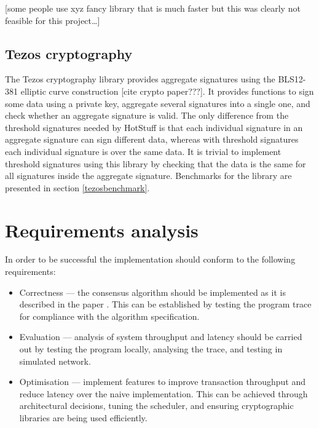 [some people use xyz fancy library that is much faster but this was clearly not feasible for this project\dots]

\subsection{Tezos cryptography} \label{tezos}
The Tezos cryptography library \cite{noauthor_tezos_nodate} provides aggregate signatures using the BLS12-381 elliptic curve construction [cite crypto paper???]. It provides functions to sign some data using a private key, aggregate several signatures into a single one, and check whether an aggregate signature is valid. The only difference from the threshold signatures needed by HotStuff is that each individual signature in an aggregate signature can sign different data, whereas with threshold signatures each individual signature is over the same data. It is trivial to implement threshold signatures using this library by checking that the data is the same for all signatures inside the aggregate signature. Benchmarks for the library are presented in section \ref{tezosbenchmark}.

\section{Requirements analysis} \label{requirements}

In order to be successful the implementation should conform to the following requirements:
\begin{itemize}
	\item Correctness --- the consensus algorithm should be implemented as it is described in the paper \cite{yin2019hotstuff}. This can be established by testing the program trace for compliance with the algorithm specification.
	\item Evaluation --- analysis of system throughput and latency should be carried out by testing the program locally, analysing the trace, and testing in simulated network.
	\item Optimisation --- implement features to improve transaction throughput and reduce latency over the naive implementation. This can be achieved through architectural decisions, tuning the scheduler, and ensuring cryptographic libraries are being used efficiently.
\end{itemize}


